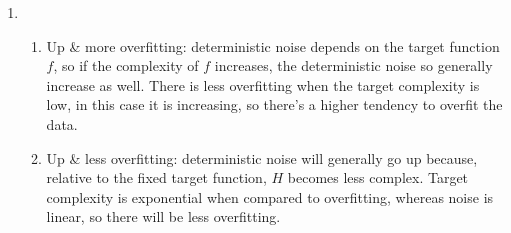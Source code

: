 \documentclass{article}
\begin{document}
    \begin{enumerate}
        \item \begin{enumerate}[label=(\alph*)]
            \item Up \& more overfitting: deterministic noise depends on the target function $f$, so if the complexity of $f$ increases, the deterministic noise so generally increase as well. There is less overfitting when the target complexity is low, in this case it is increasing, so there's a higher tendency to overfit the data.
            \item Up \& less overfitting: deterministic noise will generally go up because, relative to the fixed target function, $H$ becomes less complex. Target complexity is exponential when compared to overfitting, whereas noise is linear, so there will be less overfitting.
        \end{enumerate}


\end{enumerate}
\end{document}
